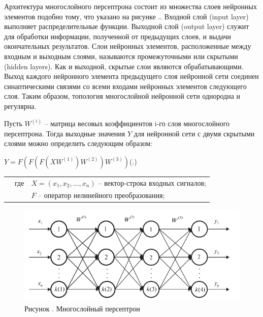 \subtitlespace

{\gostFont
	
	\par \redline Архитектура многослойного персептрона состоит из множества слоев нейронных элементов подобно тому, что указано на рисунке \spc \thechaptercntr .\theimagecntr. Входной слой (input layer) выполняет распределительные функции. Выходной слой (output layer) служит для обработки информации, полученной от предыдущих слоев, и выдачи окончательных результатов. Слои нейронных элементов, расположенные между входным и выходным слоями, называются промежуточными или скрытыми (hidden layers). Как и выходной, скрытые слои являются обрабатывающими. Выход каждого нейронного элемента предыдущего слоя нейронной сети соединен синаптическими связями со всеми входами нейронных элементов следующего слоя. Таким образом, топология многослойной нейронной сети однородна и регулярна.
	
	\par \redline Пусть $W^{(i)}$  {--} матрица весовых коэффициентов i-го слоя многослойного персептрона. Тогда выходные значения $Y$ для нейронной сети с двумя скрытыми слоями можно определить следующим образом:
	
	\formulaspace \par \redline 
	$Y = F(F(F(XW^{(1)})W^{(2)})W^{(3)})$\hfill (\thechaptercntr .\theformulacntr) \redline
	\formulaspace \addtocounter{formulacntr}{1}
	
	\begin{tabular}{p{}p{}p{}}
		& где  & $X=(x_1,x_2,\dots,x_n)$ {--} вектор-строка входных сигналов; \\
		&      & $F$ {--} оператор нелинейного преобразования; \\
	\end{tabular}
	
	\begin{figure}[H]
		\centering
		\def\svgwidth{\textwidth}
		\includegraphics[scale=1.2]{images/perceptron.png}
		\caption*{\gostFont Рисунок \thechaptercntr .\theimagecntr \spc {--} Многослойный персептрон}
	\end{figure}  \addtocounter{imagecntr}{1}
	
}
